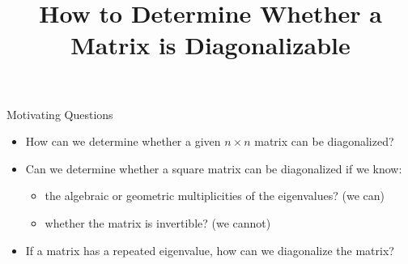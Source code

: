 \title{How to Determine Whether a Matrix is Diagonalizable}
\subtitle{\SubTitleName}
\institute[]{\Course}
\author{\Instructor}
\maketitle   

\vspace{1cm} 



\begin{frame}{Motivating Questions}

    \begin{itemize} \setlength\itemsep{1em}
        \item<1-> How can we determine whether a given $n\times n$ matrix can be diagonalized?
        \item<2-> Can we determine whether a square matrix can be diagonalized if we know:
        
        \begin{itemize}\setlength\itemsep{.5em}
            \item<3-> {\normalsize the algebraic or geometric multiplicities of the eigenvalues? (we can)}
            \item<4-> {\normalsize whether the matrix is invertible? (we cannot)}
        \end{itemize}
        
        \item<5-> If a matrix has a repeated eigenvalue, how can we diagonalize the matrix?
    \end{itemize}
    

\end{frame}



